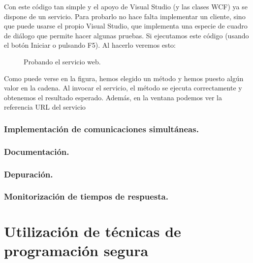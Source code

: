 \documentclass[letterpaper,10pt,spanish]{sphinxmanual}
\begin{document}
Con este código tan simple y el apoyo de Visual Studio (y las clases WCF) ya se dispone de un servicio. Para probarlo no hace falta implementar un cliente, sino que puede usarse el propio Visual Studio, que implementa una especie de cuadro de diálogo que permite hacer algunas pruebas. Si ejecutamos este código (usando el botón Iniciar o pulsando F5). Al hacerlo veremos esto:

\begin{figure}[htbp]
\centering
\capstart

\noindent{}
\caption{Probando el servicio web.}\label{\detokenize{textos/tema4:id2}}\end{figure}

Como puede verse en la figura, hemos elegido un método y hemos puesto algún valor en la cadena. Al invocar el servicio, el método se ejecuta correctamente y obtenemos el resultado esperado. Además, en la ventana podemos ver la referencia URL del servicio 


\subsection{Implementación de comunicaciones simultáneas.}
\label{\detokenize{textos/tema4:implementacion-de-comunicaciones-simultaneas}}

\subsection{Documentación.}
\label{\detokenize{textos/tema4:documentacion}}

\subsection{Depuración.}
\label{\detokenize{textos/tema4:depuracion}}

\subsection{Monitorización de tiempos de respuesta.}
\label{\detokenize{textos/tema4:monitorizacion-de-tiempos-de-respuesta}}

\chapter{Utilización de técnicas de programación segura}
\label{\detokenize{textos/tema5:utilizacion-de-tecnicas-de-programacion-segura}}\label{\detokenize{textos/tema5::doc}}
\end{document}
